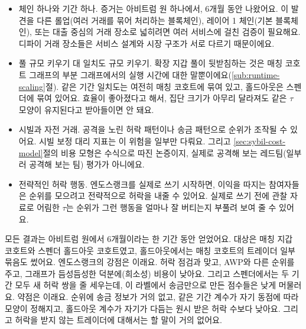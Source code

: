
\begin{itemize}
\item 체인 하나와 기간 하나. 증거는 아비트럼 원 하나에서, 6개월 동안 나왔어요. 이 발견을 다른 롤업(여러 거래를 묶어 처리하는 블록체인), 레이어 1 체인(기본 블록체인), 또는 대출 중심의 거래 장소로 넓히려면 여러 서비스에 걸친 검증이 필요해요. 디파이 거래 장소들은 서비스 설계와 시장 구조가 서로 다르기 때문이에요.
\item 풀 규모 키우기 대 일치도 규모 키우기. 확장 지갑 풀이 뒷받침하는 것은 매칭 코호트 그래프의 부분 그래프에서의 실행 시간에 대한 말뿐이에요(\ref{sub:runtime-scaling}절). 같은 기간 일치도는 여전히 매칭 코호트에 묶여 있고, 홀드아웃은 스펜더에 묶여 있어요. 효율이 좋아졌다고 해서, 집단 크기가 아무리 달라져도 같은 $\tau$ 모양이 유지된다고 받아들이면 안 돼요.
\end{itemize}


\begin{itemize}
\item 시빌과 자전 거래. 공격을 노린 허락 패턴이나 송금 패턴으로 순위가 조작될 수 있어요. 시빌 보정 대리 지표는 이 위험을 일부만 다뤄요. 그리고 \ref{sec:sybil-cost-model}절의 비용 모형은 수식으로 따진 논증이지, 실제로 공격해 보는 레드팀(일부러 공격해 보는 팀) 평가가 아니에요.
\item 전략적인 허락 행동. 엔도스랭크를 실제로 쓰기 시작하면, 이익을 따지는 참여자들은 순위를 모으려고 전략적으로 허락을 내줄 수 있어요. 실제로 쓰기 전에 관찰 자료로 어림한 $\tau$는 순위가 그런 행동을 얼마나 잘 버티는지 부풀려 보여 줄 수 있어요.
\end{itemize}


모든 결과는 아비트럼 원에서 6개월이라는 한 기간 동안 얻었어요. 대상은 매칭 지갑 코호트와 스펜더 홀드아웃 코호트였고, 홀드아웃에서는 매칭 코호트의 트레이더 일부 묶음도 썼어요. 엔도스랭크의 강점은 이래요. 허락 점검과 맞고, AWP와 다른 순위를 주고, 그래프가 듬성듬성한 덕분에(희소성) 비용이 낮아요. 그리고 스펜더에서는 두 기간 모두 새 허락 쌍을 줄 세우는데, 이 라벨에서 송금만으로 만든 점수들은 낮게 머물러요. 약점은 이래요. 순위에 송금 정보가 거의 없고, 같은 기간 계수가 자기 동점에 따라 모양이 정해지고, 홀드아웃 계수가 자기가 다듬는 원시 받은 허락 수보다 낮아요. 그리고 허락을 받지 않는 트레이더에 대해서는 할 말이 거의 없어요.

